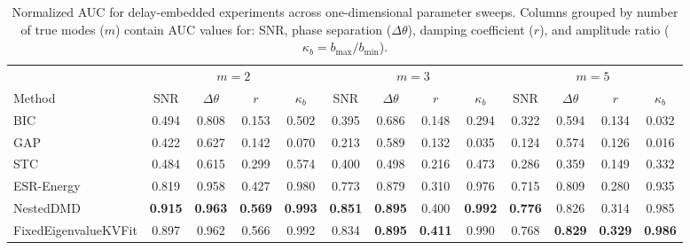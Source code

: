\begin{table}[t]
\centering
\small
\setlength{\tabcolsep}{3pt}
\begin{tabular}{lcccccccccccc}
\hline
 & \multicolumn{4}{c}{$m = 2$} & \multicolumn{4}{c}{$m = 3$} & \multicolumn{4}{c}{$m = 5$} \\
Method & SNR & $\Delta\theta$ & $r$ & $\kappa_b$ & SNR & $\Delta\theta$ & $r$ & $\kappa_b$ & SNR & $\Delta\theta$ & $r$ & $\kappa_b$ \\
\hline
BIC & 0.494 & 0.808 & 0.153 & 0.502 & 0.395 & 0.686 & 0.148 & 0.294 & 0.322 & 0.594 & 0.134 & 0.032 \\
GAP & 0.422 & 0.627 & 0.142 & 0.070 & 0.213 & 0.589 & 0.132 & 0.035 & 0.124 & 0.574 & 0.126 & 0.016 \\
STC & 0.484 & 0.615 & 0.299 & 0.574 & 0.400 & 0.498 & 0.216 & 0.473 & 0.286 & 0.359 & 0.149 & 0.332 \\
ESR-Energy & 0.819 & 0.958 & 0.427 & 0.980 & 0.773 & 0.879 & 0.310 & 0.976 & 0.715 & 0.809 & 0.280 & 0.935 \\
NestedDMD & \textbf{0.915} & \textbf{0.963} & \textbf{0.569} & \textbf{0.993} & \textbf{0.851} & \textbf{0.895} & 0.400 & \textbf{0.992} & \textbf{0.776} & 0.826 & 0.314 & 0.985 \\
FixedEigenvalueKVFit & 0.897 & 0.962 & 0.566 & 0.992 & 0.834 & \textbf{0.895} & \textbf{0.411} & 0.990 & 0.768 & \textbf{0.829} & \textbf{0.329} & \textbf{0.986} \\
\hline
\end{tabular}
\caption{Normalized AUC for delay-embedded experiments across one-dimensional parameter sweeps. Columns grouped by number of true modes ($m$) contain AUC values for: SNR, phase separation ($\Delta\theta$), damping coefficient ($r$), and amplitude ratio ($\kappa_b = b_{\max}/b_{\min}$).}
\label{tab:auc_delay_embedded}
\end{table}
